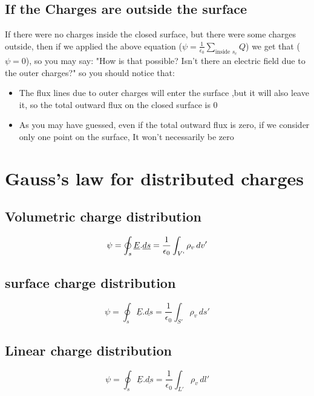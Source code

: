 \documentclass[12 pt]{article}
\begin{document}
\subsection{If the Charges are outside the surface}
If there were no charges inside the closed surface, but there were some charges outside, then if we applied the above equation ($\psi=\frac{1}{\epsilon_0} \sum_{\text{inside }s_c}Q$) we get that ($\psi=0$), so you may say: "How is that possible? Isn't there an electric field due to the outer charges?" so you should notice that: \begin{itemize}
    \item The flux lines due to outer charges will enter the surface ,but it will also leave it, so the total outward flux on the closed surface is 0
    \item As you may have guessed, even if the total outward flux is zero, if we consider only one point on the surface, It won't necessarily be zero
\end{itemize}
\section{Gauss's law for distributed charges}
\subsection{Volumetric charge distribution}
$$\psi= \oint_s \underline{E}.\underline{ds}=\frac{1}{\epsilon_0}\int_{V`} \rho_v \, dv'$$
\subsection{surface charge distribution}
$$\psi= \oint_s \underline{E}.\underline{ds}=\frac{1}{\epsilon_0}\int_{S'} \rho_v \, ds'$$
\subsection{Linear charge distribution}
$$\psi= \oint_s \underline{E}.\underline{ds}=\frac{1}{\epsilon_0}\int_{L'} \rho_v \, dl'$$
\end{document}
